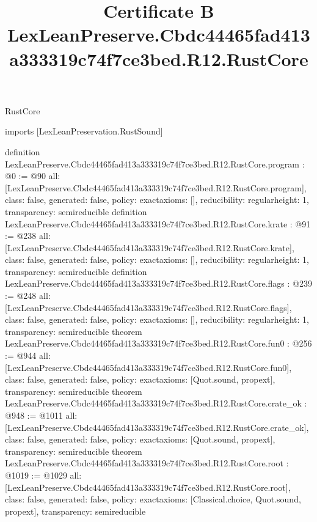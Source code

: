 \begin{lexlean}{RustCore}
\title{Certificate B LexLeanPreserve.Cbdc44465fad413a333319c74f7ce3bed.R12.RustCore}
\begin{coremodule}
imports [LexLeanPreservation.RustSound]

definition LexLeanPreserve.Cbdc44465fad413a333319c74f7ce3bed.R12.RustCore.program : @0 := @90 {
  all: [LexLeanPreserve.Cbdc44465fad413a333319c74f7ce3bed.R12.RustCore.program],
  class: false,
  generated: false,
  policy: exact{axioms: []},
  reducibility: regular{height: 1},
  transparency: semireducible
}
definition LexLeanPreserve.Cbdc44465fad413a333319c74f7ce3bed.R12.RustCore.krate : @91 := @238 {
  all: [LexLeanPreserve.Cbdc44465fad413a333319c74f7ce3bed.R12.RustCore.krate],
  class: false,
  generated: false,
  policy: exact{axioms: []},
  reducibility: regular{height: 1},
  transparency: semireducible
}
definition LexLeanPreserve.Cbdc44465fad413a333319c74f7ce3bed.R12.RustCore.flags : @239 := @248 {
  all: [LexLeanPreserve.Cbdc44465fad413a333319c74f7ce3bed.R12.RustCore.flags],
  class: false,
  generated: false,
  policy: exact{axioms: []},
  reducibility: regular{height: 1},
  transparency: semireducible
}
theorem LexLeanPreserve.Cbdc44465fad413a333319c74f7ce3bed.R12.RustCore.fun0 : @256 := @944 {
  all: [LexLeanPreserve.Cbdc44465fad413a333319c74f7ce3bed.R12.RustCore.fun0],
  class: false,
  generated: false,
  policy: exact{axioms: [Quot.sound, propext]},
  transparency: semireducible
}
theorem LexLeanPreserve.Cbdc44465fad413a333319c74f7ce3bed.R12.RustCore.crate_ok : @948 := @1011 {
  all: [LexLeanPreserve.Cbdc44465fad413a333319c74f7ce3bed.R12.RustCore.crate_ok],
  class: false,
  generated: false,
  policy: exact{axioms: [Quot.sound, propext]},
  transparency: semireducible
}
theorem LexLeanPreserve.Cbdc44465fad413a333319c74f7ce3bed.R12.RustCore.root : @1019 := @1029 {
  all: [LexLeanPreserve.Cbdc44465fad413a333319c74f7ce3bed.R12.RustCore.root],
  class: false,
  generated: false,
  policy: exact{axioms: [Classical.choice, Quot.sound, propext]},
  transparency: semireducible
}


\end{coremodule}
\end{lexlean}
